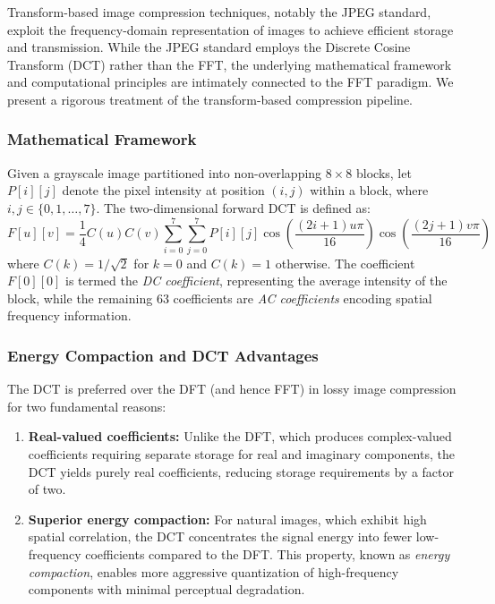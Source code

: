 \documentclass[a4paper]{article}
\theoremstyle{definition}
\begin{document}
Transform-based image compression techniques, notably the JPEG standard, exploit the frequency-domain representation of images to achieve efficient storage and transmission. While the JPEG standard employs the Discrete Cosine Transform (DCT) rather than the FFT, the underlying mathematical framework and computational principles are intimately connected to the FFT paradigm. We present a rigorous treatment of the transform-based compression pipeline.

\subsubsection{Mathematical Framework}

Given a grayscale image partitioned into non-overlapping \(8 \times 8\) blocks, let \(P[i][j]\) denote the pixel intensity at position \((i,j)\) within a block, where \(i,j \in \{0, 1, \ldots, 7\}\). The two-dimensional forward DCT is defined as:
\[
F[u][v] = \frac{1}{4} C(u) C(v) \sum_{i=0}^{7} \sum_{j=0}^{7} P[i][j] \cos\left(\frac{(2i+1)u\pi}{16}\right) \cos\left(\frac{(2j+1)v\pi}{16}\right)
\]
where \(C(k) = 1/\sqrt{2}\) for \(k = 0\) and \(C(k) = 1\) otherwise. The coefficient \(F[0][0]\) is termed the \textit{DC coefficient}, representing the average intensity of the block, while the remaining 63 coefficients are \textit{AC coefficients} encoding spatial frequency information.

\subsubsection{Energy Compaction and DCT Advantages}

The DCT is preferred over the DFT (and hence FFT) in lossy image compression for two fundamental reasons:
\begin{enumerate}
    \item \textbf{Real-valued coefficients:} Unlike the DFT, which produces complex-valued coefficients requiring separate storage for real and imaginary components, the DCT yields purely real coefficients, reducing storage requirements by a factor of two.
    \item \textbf{Superior energy compaction:} For natural images, which exhibit high spatial correlation, the DCT concentrates the signal energy into fewer low-frequency coefficients compared to the DFT. This property, known as \textit{energy compaction}, enables more aggressive quantization of high-frequency components with minimal perceptual degradation.
\end{enumerate}
\end{document}
